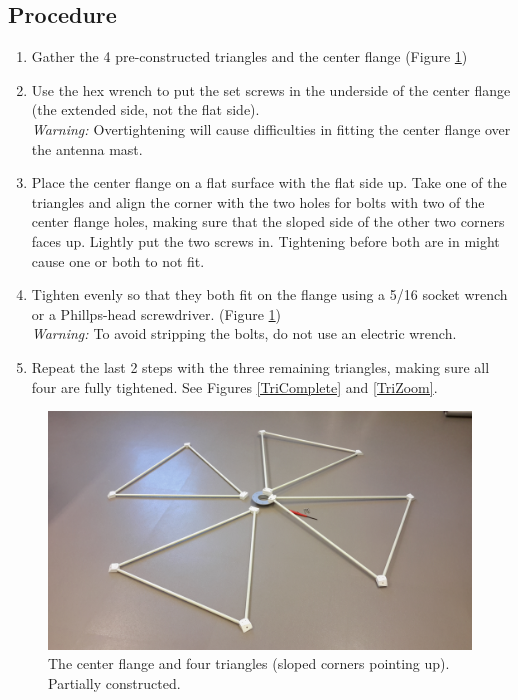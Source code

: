 \documentclass[12pt]{article}
\begin{document}
\begin{enumerate}
	\subsection{Procedure}
		\begin{enumerate}
			\item Gather the 4 pre-constructed triangles and the center flange (Figure \ref{TriHalfDone})
			\item Use the hex wrench to put the set screws in the underside of the center flange (the extended side, not the flat side). \\ \emph{Warning: \bf}Overtightening will cause difficulties in fitting the center flange over the antenna mast.
			\item Place the center flange on a flat surface with the flat side up. Take one of the triangles and align the corner with the two holes for bolts with two of the center flange holes, making sure that the sloped side of the other two corners faces up. Lightly put the two screws in. Tightening before both are in might cause one or both to not fit.
			\item Tighten evenly so that they both fit on the flange using a 5/16 socket wrench or a Phillps-head screwdriver. (Figure \ref{TriHalfDone}) \\ \emph{Warning: \bf}To avoid stripping the bolts, do not use an electric wrench.
			\item Repeat the last 2 steps with the three remaining triangles, making sure all four are fully tightened. See Figures \ref{TriComplete} and \ref{TriZoom}.

		\end{enumerate}

\begin{figure}[!hp]
  \center
     \includegraphics[width=\linewidth]{20141125_095619.jpg}
     \caption{The center flange and four triangles (sloped corners pointing up). Partially constructed. \label{TriHalfDone}}
\end{figure}


\end{enumerate}
\end{document}

